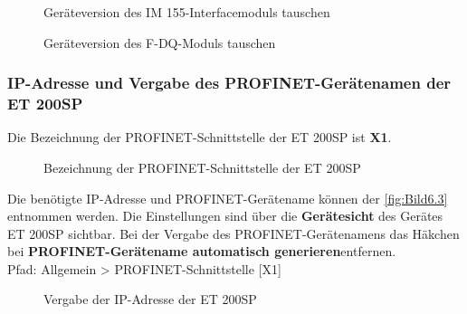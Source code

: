 \begin{figure}[H]
   \centering
   \caption[Geräteversion des IM 155-Interfacemoduls tauschen]{Geräteversion des IM 155-Interfacemoduls tauschen}
   \label{fig:Bild6.25}
\end{figure}

\begin{figure}[H]
   \centering
   \caption[Geräteversion des F-DQ-Moduls tauschen]{Geräteversion des F-DQ-Moduls tauschen}
   \label{fig:Bild6.26}
\end{figure}

\subsubsection{IP-Adresse und Vergabe des PROFINET-Gerätenamen der ET 200SP} \label{sec: IP-Adresse_PROFINET-Gerätename_ET_200SP}
Die Bezeichnung der PROFINET-Schnittstelle der ET 200SP ist \textbf{X1}.

\begin{figure}[H]
   \centering
   \caption[Bezeichnung der PROFINET-Schnitstelle der ET 200SP]{Bezeichnung der PROFINET-Schnittstelle der ET 200SP}
   \label{fig:Bild6.27}
\end{figure}

Die benötigte IP-Adresse und PROFINET-Gerätename können der \autoref{fig:Bild6.3} entnommen werden. Die Einstellungen sind über die \textbf{Gerätesicht} des Gerätes ET 200SP sichtbar. Bei der Vergabe des PROFINET-Gerätenamens das Häkchen bei \glqq\textbf{PROFINET-Gerätename automatisch generieren}\grqq\:entfernen.\\
Pfad: Allgemein > PROFINET-Schnittstelle [X1]

\begin{figure}[H]
   \centering
   \caption[Vergabe der IP-Adresse der ET 200SP]{Vergabe der IP-Adresse der ET 200SP}
   \label{fig:Bild6.28}
\end{figure}


